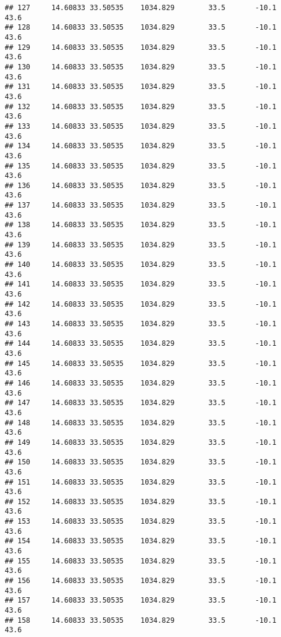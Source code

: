 \documentclass[]{article}
\begin{document}
\begin{verbatim}
## 127     14.60833 33.50535    1034.829        33.5       -10.1              43.6
## 128     14.60833 33.50535    1034.829        33.5       -10.1              43.6
## 129     14.60833 33.50535    1034.829        33.5       -10.1              43.6
## 130     14.60833 33.50535    1034.829        33.5       -10.1              43.6
## 131     14.60833 33.50535    1034.829        33.5       -10.1              43.6
## 132     14.60833 33.50535    1034.829        33.5       -10.1              43.6
## 133     14.60833 33.50535    1034.829        33.5       -10.1              43.6
## 134     14.60833 33.50535    1034.829        33.5       -10.1              43.6
## 135     14.60833 33.50535    1034.829        33.5       -10.1              43.6
## 136     14.60833 33.50535    1034.829        33.5       -10.1              43.6
## 137     14.60833 33.50535    1034.829        33.5       -10.1              43.6
## 138     14.60833 33.50535    1034.829        33.5       -10.1              43.6
## 139     14.60833 33.50535    1034.829        33.5       -10.1              43.6
## 140     14.60833 33.50535    1034.829        33.5       -10.1              43.6
## 141     14.60833 33.50535    1034.829        33.5       -10.1              43.6
## 142     14.60833 33.50535    1034.829        33.5       -10.1              43.6
## 143     14.60833 33.50535    1034.829        33.5       -10.1              43.6
## 144     14.60833 33.50535    1034.829        33.5       -10.1              43.6
## 145     14.60833 33.50535    1034.829        33.5       -10.1              43.6
## 146     14.60833 33.50535    1034.829        33.5       -10.1              43.6
## 147     14.60833 33.50535    1034.829        33.5       -10.1              43.6
## 148     14.60833 33.50535    1034.829        33.5       -10.1              43.6
## 149     14.60833 33.50535    1034.829        33.5       -10.1              43.6
## 150     14.60833 33.50535    1034.829        33.5       -10.1              43.6
## 151     14.60833 33.50535    1034.829        33.5       -10.1              43.6
## 152     14.60833 33.50535    1034.829        33.5       -10.1              43.6
## 153     14.60833 33.50535    1034.829        33.5       -10.1              43.6
## 154     14.60833 33.50535    1034.829        33.5       -10.1              43.6
## 155     14.60833 33.50535    1034.829        33.5       -10.1              43.6
## 156     14.60833 33.50535    1034.829        33.5       -10.1              43.6
## 157     14.60833 33.50535    1034.829        33.5       -10.1              43.6
## 158     14.60833 33.50535    1034.829        33.5       -10.1              43.6

\end{verbatim}
\end{document}
